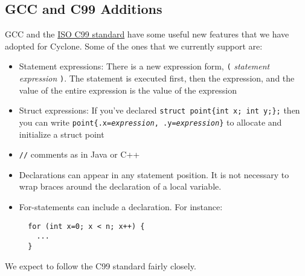 \subsection{GCC and C99 Additions}

GCC and the
\href{http://web.onetelnet.ch/~twolf/tw/c/c9x_changes.html}{ISO C99
  standard} have some useful new features that we have adopted for
Cyclone. Some of the ones that we currently support are:
\begin{itemize}
\item Statement expressions: There is a new expression form,
  \texttt{(\lb} \textit{statement} \textit{expression} \texttt{\rb)}.
  The statement is executed first, then the expression, and the value
  of the entire expression is the value of the expression
\item Struct expressions:  If you've declared
  \texttt{struct point\{int x; int y;\};} then you can write
  \texttt{point\{.x=\textit{expression}, .y=\textit{expression}\}}
 to allocate and initialize a struct point
\item \texttt{//} comments as in Java or C++
\item Declarations can appear in any statement position.  It is not
  necessary to wrap braces around the declaration of a local variable.
\item For-statements can include a declaration. For instance:
\begin{verbatim}
  for (int x=0; x < n; x++) { 
    ...
  }
\end{verbatim}
\end{itemize}

We expect to follow the C99 standard fairly closely.

